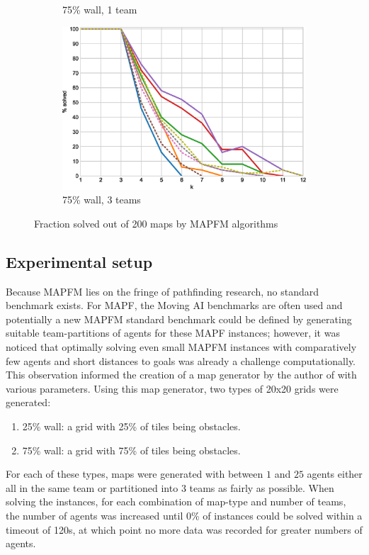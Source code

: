\documentclass[english,10pt]{article}
\begin{document}
\begin{figure}[b]
\begin{subfigure}{0.44\textwidth}
			\caption{75\% wall, 1 team}
			\label{fig:r-75-1-p}
		\end{subfigure}
		\begin{subfigure}{0.44\textwidth}
			\centering
			\includegraphics[width=\linewidth]{img/results/relative-comparison/75-3-p}
			\caption{75\% wall, 3 teams}
			\label{fig:r-75-3-p}
		\end{subfigure}
		\caption{Fraction solved out of 200 maps by MAPFM algorithms}
		\label{fig:r-probs}
	\end{figure}
	
	\restoregeometry
	\subsection{Experimental setup}
	Because MAPFM lies on the fringe of pathfinding research, no standard benchmark exists. For MAPF, the Moving AI benchmarks \cite{sturtevant2012} are often used and potentially a new MAPFM standard benchmark could be defined by generating suitable team-partitions of agents for these MAPF instances; however, it was noticed that optimally solving even small MAPFM instances with comparatively few agents and short distances to goals was already a challenge computationally. This observation informed the creation of a map generator by the author of \cite{jong2021} with various parameters. Using this map generator, two types of 20x20 grids were generated:
	\begin{enumerate}
		\item 25\% wall: a grid with 25\% of tiles being obstacles.
		\item 75\% wall: a grid with 75\% of tiles being obstacles. 
	\end{enumerate}
	For each of these types, maps were generated with between $1$ and $25$ agents either all in the same team or partitioned into $3$ teams as fairly as possible. When solving the instances, for each combination of map-type and number of teams, the number of agents was increased until 0\% of instances could be solved within a timeout of 120s, at which point no more data was recorded for greater numbers of agents.
	
\end{document}
